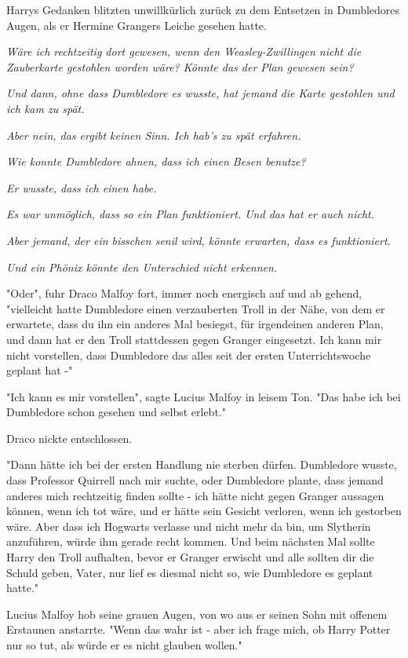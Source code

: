 {Harrys Gedanken blitzten unwillkürlich zurück zu dem Entsetzen in Dumbledores Augen, als er Hermine Grangers Leiche gesehen hatte.

\emph{Wäre ich rechtzeitig dort gewesen, wenn den Weasley-Zwillingen nicht die Zauberkarte gestohlen worden wäre? Könnte das der Plan gewesen sein?}

\emph{Und dann, ohne dass Dumbledore es wusste, hat jemand die Karte gestohlen und ich kam zu spät.}

\emph{Aber nein, das ergibt keinen Sinn. Ich hab's zu spät erfahren.}

\emph{Wie konnte Dumbledore ahnen, dass ich einen Besen benutze?}

\emph{Er wusste, dass ich einen habe.}

\emph{Es war unmöglich, dass so ein Plan funktioniert. Und das hat er auch nicht.}

\emph{Aber jemand, der ein bisschen senil wird, könnte erwarten, dass es funktioniert.}

\emph{Und ein Phönix könnte den Unterschied nicht erkennen.}

"Oder", fuhr Draco Malfoy fort, immer noch energisch auf und ab gehend, "vielleicht hatte Dumbledore einen verzauberten Troll in der Nähe, von dem er erwartete, dass du ihn ein anderes Mal besiegst, für irgendeinen anderen Plan, und dann hat er den Troll stattdessen gegen Granger eingesetzt. Ich kann mir nicht vorstellen, dass Dumbledore das alles seit der ersten Unterrichtswoche geplant hat -"

"Ich kann es mir vorstellen", sagte Lucius Malfoy in leisem Ton. "Das habe ich bei Dumbledore schon gesehen und selbst erlebt."

Draco nickte entschlossen.

"Dann hätte ich bei der ersten Handlung nie sterben dürfen. Dumbledore wusste, dass Professor Quirrell nach mir suchte, oder Dumbledore plante, dass jemand anderes mich rechtzeitig finden sollte - ich hätte nicht gegen Granger aussagen können, wenn ich tot wäre, und er hätte sein Gesicht verloren, wenn ich gestorben wäre. Aber dass ich Hogwarts verlasse und nicht mehr da bin, um Slytherin anzuführen, würde ihm gerade recht kommen. Und beim nächsten Mal sollte Harry den Troll aufhalten, bevor er Granger erwischt und alle sollten dir die Schuld geben, Vater, nur lief es diesmal nicht so, wie Dumbledore es geplant hatte."

Lucius Malfoy hob seine grauen Augen, von wo aus er seinen Sohn mit offenem Erstaunen anstarrte. "Wenn das wahr ist - aber ich frage mich, ob Harry Potter nur so tut, als würde er es nicht glauben wollen."

}
